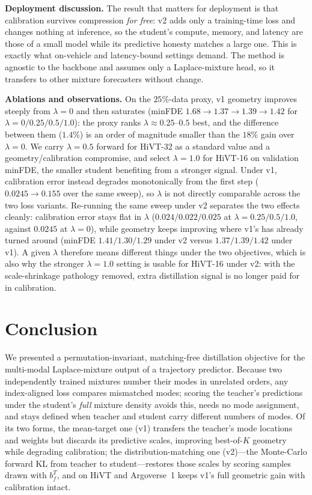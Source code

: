 \documentclass[conference]{IEEEtran}
\newcommand{\scale}{b}
\begin{document}
\textbf{Deployment discussion.} The result that matters for deployment is that
calibration survives compression \emph{for free}: v2 adds only a training-time loss
and changes nothing at inference, so the student's compute, memory, and latency are
those of a small model while its predictive honesty matches a large one. This is exactly
what on-vehicle and latency-bound settings demand. The method is agnostic to the
backbone and assumes only a Laplace-mixture head, so it transfers to other mixture
forecasters without change.

\textbf{Ablations and observations.} On the $25\%$-data proxy, v1 geometry
improves steeply from $\lambda{=}0$ and then saturates (minFDE
$1.68\to1.37\to1.39\to1.42$ for $\lambda{=}0/0.25/0.5/1.0$): the proxy ranks
$\lambda\approx0.25$--$0.5$ best, and the difference between them ($1.4\%$) is an
order of magnitude smaller than the $18\%$ gain over $\lambda{=}0$. We carry
$\lambda{=}0.5$ forward for HiVT-32 as a standard value and a
geometry/calibration compromise, and select $\lambda{=}1.0$ for HiVT-16 on
validation minFDE, the smaller student benefiting from a stronger signal. Under
v1, calibration error instead degrades monotonically from the first step
($0.0245\to0.155$ over the same sweep), so $\lambda$ is not directly comparable 
across the two loss variants. Re-running the same sweep under v2 separates the
two effects cleanly: calibration error stays flat in $\lambda$
($0.024/0.022/0.025$ at $\lambda{=}0.25/0.5/1.0$, against $0.0245$ at
$\lambda{=}0$), while geometry keeps improving where v1's has already turned
around (minFDE $1.41/1.30/1.29$ under v2 versus $1.37/1.39/1.42$ under v1).  A
given $\lambda$ therefore means different things under the two objectives, which
is also why the stronger $\lambda{=}1.0$ setting is usable for HiVT-16 under v2:
with the scale-shrinkage pathology removed, extra distillation signal is no
longer paid for in calibration.
\section{Conclusion}
We presented a permutation-invariant, matching-free distillation objective for the
multi-modal Laplace-mixture output of a trajectory predictor. Because two
independently trained mixtures number their modes in unrelated orders, any
index-aligned loss compares mismatched modes; scoring the teacher's predictions under
the student's \emph{full} mixture density avoids this, needs no mode assignment, and
stays defined when teacher and student carry different numbers of modes. Of its two
forms, the mean-target one (v1) transfers the teacher's mode locations and weights but
discards its predictive scales, improving best-of-$K$ geometry while degrading
calibration; the distribution-matching one (v2)---the Monte-Carlo forward KL from
teacher to student---restores those scales by scoring samples drawn with
$\scale^T_f$, and on HiVT and Argoverse~1 keeps v1's full geometric gain with
calibration intact. 
\end{document}
